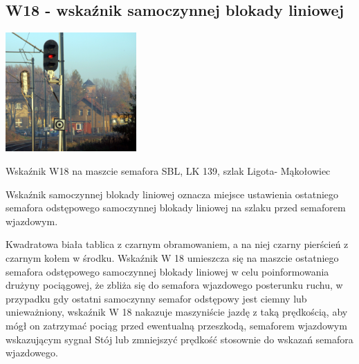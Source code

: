 \subsection{W18 - wskaźnik samoczynnej blokady liniowej}

	\begin{marginfigure}
	\includegraphics[width=5cm]{skryptkierownik-img/skryptkierownik-img017.jpg}
	\caption{Wskaźnik W18 na maszcie semafora SBL, LK 139, szlak Ligota- Mąkołowiec}
\end{marginfigure}
\begin{tcolorbox}[colback=black!5!white,colframe=white!55!black,title=Wskaźnik W18] {\textquotedbl}Wskaźnik samoczynnej blokady liniowej{\textquotedbl} oznacza miejsce ustawienia ostatniego semafora odstępowego samoczynnej blokady liniowej na szlaku przed semaforem wjazdowym. 
\end{tcolorbox}
Kwadratowa biała tablica z czarnym obramowaniem, a na niej czarny pierścień z czarnym kołem w środku. Wskaźnik W 18 umieszcza się na maszcie ostatniego semafora odstępowego samoczynnej blokady liniowej w celu poinformowania drużyny pociągowej, że zbliża się do semafora wjazdowego posterunku ruchu, w przypadku gdy ostatni samoczynny semafor odstępowy jest ciemny lub
unieważniony, wskaźnik W 18 nakazuje maszyniście jazdę z taką prędkością, aby mógł on zatrzymać pociąg przed ewentualną przeszkodą, semaforem wjazdowym wskazującym sygnał {\textquotedbl}Stój{\textquotedbl} lub zmniejszyć prędkość stosownie do wskazań semafora wjazdowego.

